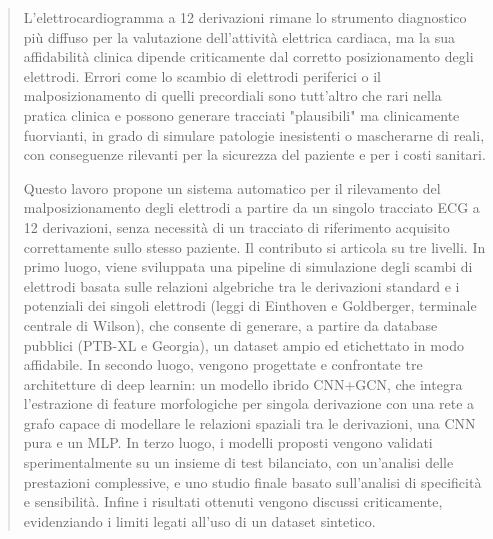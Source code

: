 \documentclass[12pt,a4paper,openright,twoside]{report}
\begin{document}

\pagestyle{empty}

\tableofcontents


\setlength{\headwidth}{\textwidth}
\addtolength{\headwidth}{20pt} %

\begin{abstract}
	L'elettrocardiogramma a 12 derivazioni rimane lo strumento diagnostico più diffuso per la valutazione dell'attività elettrica cardiaca, ma la sua affidabilità clinica dipende criticamente dal corretto posizionamento degli elettrodi. Errori come lo scambio di elettrodi periferici o il malposizionamento di quelli precordiali sono tutt'altro che rari nella pratica clinica e possono generare tracciati "plausibili" ma clinicamente fuorvianti, in grado di simulare patologie inesistenti o mascherarne di reali, con conseguenze rilevanti per la sicurezza del paziente e per i costi sanitari.
	
	Questo lavoro propone un sistema automatico per il rilevamento del malposizionamento degli elettrodi a partire da un singolo tracciato ECG a 12 derivazioni, senza necessità di un tracciato di riferimento acquisito correttamente sullo stesso paziente. Il contributo si articola su tre livelli. In primo luogo, viene sviluppata una pipeline di simulazione degli scambi di elettrodi basata sulle relazioni algebriche tra le derivazioni standard e i potenziali dei singoli elettrodi (leggi di Einthoven e Goldberger, terminale centrale di Wilson), che consente di generare, a partire da database pubblici (PTB-XL e Georgia), un dataset ampio ed etichettato in modo affidabile. In secondo luogo, vengono progettate e confrontate tre architetture di deep learnin: un modello ibrido CNN+GCN, che integra l'estrazione di feature morfologiche per singola derivazione con una rete a grafo capace di modellare le relazioni spaziali tra le derivazioni, una CNN pura e un MLP. In terzo luogo, i modelli proposti vengono validati sperimentalmente su un insieme di test bilanciato, con un'analisi delle prestazioni complessive, e uno studio finale basato sull'analisi di specificità e sensibilità. Infine i risultati ottenuti vengono discussi criticamente, evidenziando i limiti legati all'uso di un dataset sintetico.	
\end{abstract}
\end{document}
